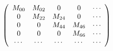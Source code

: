 \begin{equation}
\label{eq:stab.matrix.grav}
\left(
\begin{array}{c c c c c}
M_{00}&
M_{02}&
0&
0&
\cdots\\
0&
M_{22}&
M_{24}&
0&
\cdots\\
0&
0&
M_{44}&
M_{46}&
\cdots\\
0&
0&
0&
M_{66}&
\cdots\\
\cdots&
\cdots&
\cdots&
\cdots&
\cdots
\end{array}
\right)
\end{equation}

